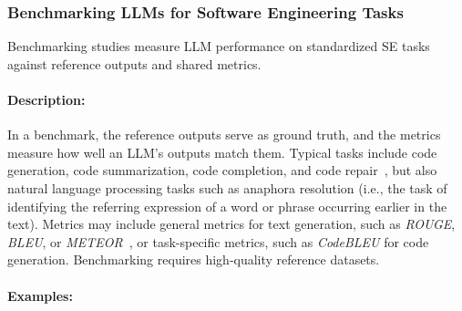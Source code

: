 \documentclass[smallextended]{svjour3}
\newcommand{\studytypesubsection}[1]{\subsubsection{#1}}
\newcommand{\studytypeparagraph}[1]{\paragraph{\bfseries #1:}}
\newcommand{\studytypesubsection}[1]{\subsection{#1}}
\newcommand{\studytypeparagraph}[1]{\subsubsection{#1}}
\begin{document}
\studytypesubsection{Benchmarking LLMs for Software Engineering Tasks}
\label{sec:benchmarking-llms-for-software-engineering-tasks}

Benchmarking studies measure LLM performance on standardized SE tasks against reference outputs and shared metrics.

\studytypeparagraph{Description}

In a benchmark, the reference outputs serve as ground truth, and the metrics measure how well an LLM's outputs match them. Typical tasks include code generation, code summarization, code completion, and code repair~\cite{yang2025code}, but also natural language processing tasks such as anaphora resolution (i.e., the task of identifying the referring expression of a word or phrase occurring earlier in the text). %
Metrics may include general metrics for text generation, such as \emph{ROUGE}, \emph{BLEU}, or \emph{METEOR}~\cite{DBLP:journals/tosem/HouZLYWLLLGW24}, or task-specific metrics, such as \emph{CodeBLEU} for code generation. Benchmarking requires high-quality reference datasets.

\studytypeparagraph{Examples}
\end{document}
